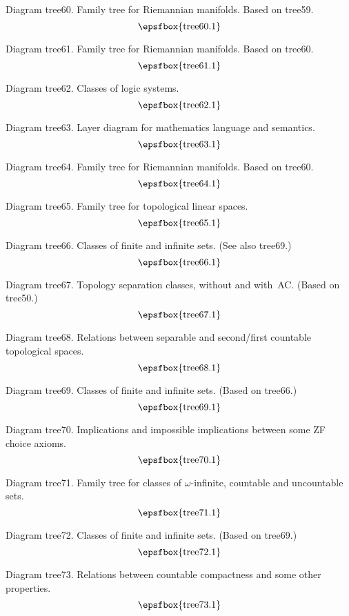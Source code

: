 Diagram tree60. Family tree for Riemannian manifolds. Based on tree59.
$$
\centerline{\epsfbox{tree60.1}}
$$

Diagram tree61. Family tree for Riemannian manifolds. Based on tree60.
$$
\centerline{\epsfbox{tree61.1}}
$$

\filleject

Diagram tree62. Classes of logic systems.
$$
\centerline{\epsfbox{tree62.1}}
$$

Diagram tree63. Layer diagram for mathematics language and semantics.
$$
\centerline{\epsfbox{tree63.1}}
$$

Diagram tree64. Family tree for Riemannian manifolds. Based on tree60.
$$
\centerline{\epsfbox{tree64.1}}
$$

Diagram tree65. Family tree for topological linear spaces.
$$
\centerline{\epsfbox{tree65.1}}
$$

\filleject

Diagram tree66. Classes of finite and infinite sets. (See also tree69.)
$$
\centerline{\epsfbox{tree66.1}}
$$

Diagram tree67. Topology separation classes, without and with~AC. (Based on
tree50.)
$$
\centerline{\epsfbox{tree67.1}}
$$

Diagram tree68. Relations between separable and second/first countable
topological spaces.
$$
\centerline{\epsfbox{tree68.1}}
$$

\filleject

Diagram tree69. Classes of finite and infinite sets. (Based on tree66.)
$$
\centerline{\epsfbox{tree69.1}}
$$

Diagram tree70. Implications and impossible implications between some ZF choice
axioms.
$$
\centerline{\epsfbox{tree70.1}}
$$

Diagram tree71. Family tree for classes of $\omega$-infinite, countable and
uncountable sets.
$$
\centerline{\epsfbox{tree71.1}}
$$

\filleject

Diagram tree72. Classes of finite and infinite sets. (Based on tree69.)
$$
\centerline{\epsfbox{tree72.1}}
$$

Diagram tree73. Relations between countable compactness and some other
properties.
$$
\centerline{\epsfbox{tree73.1}}
$$

